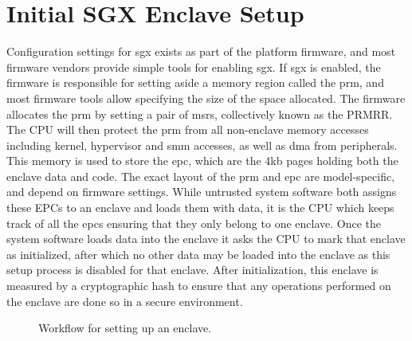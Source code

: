 \section{Initial SGX Enclave Setup}
Configuration settings for \gls{sgx} exists as part of the platform firmware, and most firmware vendors provide simple tools for enabling \gls{sgx}. If \gls{sgx} is enabled, the firmware is responsible for setting aside a memory region called the \gls{prm}, and most firmware tools allow specifying the size of the space allocated. The firmware allocates the \gls{prm} by setting a pair of \glspl{msr}, collectively known as the PRMRR. The CPU will then protect the \gls{prm} from all non-enclave memory accesses including kernel, hypervisor and \gls{smm} accesses, as well as \gls{dma} from peripherals\cite{Costan2016IntelSE}. This memory is used to store the \gls{epc}, which are the 4kb pages holding both the enclave data and code. The exact layout of the \gls{prm} and \gls{epc} are model-specific, and depend on firmware settings. While untrusted system software both assigns these EPCs to an enclave and loads them with data, it is the CPU which keeps track of all the \gls{epc}s ensuring that they only belong to one enclave. Once the system software loads data into the enclave it asks the CPU to mark that enclave as initialized, after which no other data may be loaded into the enclave as this setup process is disabled for that enclave. After initialization, this enclave is measured by a cryptographic hash to ensure that any operations performed on the enclave are done so in a secure environment.
\vspace{10 mm}
\begin{figure}[h]
\centering
{}

\caption[Setting Up SGX]{Workflow for setting up an enclave.}
\label{fig:sgx_setup}
\end{figure}

